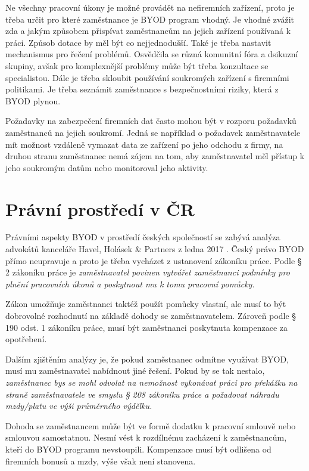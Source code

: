 Ne všechny pracovní úkony je možné provádět na nefiremních zařízení, proto je třeba určit pro které zaměstnance je BYOD program vhodný. 
Je vhodné zvážit zda a jakým způsobem přispívat zaměstnancům na jejich zařízení používaná k práci. Způsob dotace by měl být co nejjednodušší. Také je třeba nastavit mechanismus pro řečení problémů. Osvědčila se různá komunitní fóra a dsikuzní skupiny, avšak pro komplexnější problémy může být třeba konzultace se specialistou. Dále je třeba skloubit používání soukromých zařízení s firemními politikami. Je třeba seznámit zaměstnance s bezpečnostními riziky, která z BYOD plynou. 

Požadavky na zabezpečení firemních dat často mohou být v rozporu požadavků zaměstnanců na jejich soukromí. Jedná se například o požadavek zaměstnavatele mít možnost vzdáleně vymazat data ze zařízení po jeho odchodu z firmy, na druhou stranu zaměstnanec nemá zájem na tom, aby zaměstnavatel měl přístup k jeho soukromým datům nebo monitoroval jeho aktivity.

\section{Právní prostředí v ČR}

Právními aspekty BYOD v prostředí českých společností se zabývá analýza advokátů kanceláře Havel, Holásek \& Partners z ledna 2017 \cite{pravniProstor}. Český právo BYOD přímo neupravuje a proto je třeba vycházet z ustanovení zákoníku práce. Podle § 2 zákoníku práce je \textit{zaměstnavatel povinen vytvářet zaměstnanci podmínky pro plnění pracovních úkonů a poskytnout mu k tomu pracovní pomůcky.}

Zákon umožňuje zaměstnanci taktéž použít pomůcky vlastní, ale musí to být dobrovolné rozhodnutí na základě dohody se zaměstnavatelem. Zároveň podle § 190 odst. 1  zákoníku práce, musí být zaměstnanci poskytnuta kompenzace za opotřebení.

Dalším zjištěním analýzy je, že pokud zaměstnanec odmítne využívat BYOD, musí mu zaměstnavatel nabídnout jiné řešení. Pokud by se tak nestalo, \textit{zaměstnanec bys se mohl odvolat na nemožnost vykonávat práci pro překážku na straně zaměstnavatele ve smyslu § 208 zákoníku práce a požadovat náhradu mzdy/platu ve výši průměrného výdělku.}

Dohoda se zaměstnancem může být ve formě dodatku k pracovní smlouvě nebo smlouvou samostatnou. Nesmí vést k rozdílnému zacházení k zaměstnancům, kteří do BYOD programu nevstoupili. Kompenzace musí být odlišena od firemních bonusů a mzdy, výše však není stanovena. 

